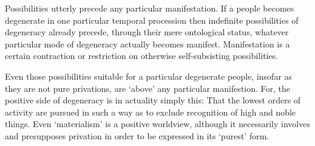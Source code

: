 \begin{footnotesize}
\begin{sffamily}
Possibilities utterly precede any particular manifestation. If a people becomes degenerate in one particular temporal procession then indefinite possibilities of degeneracy already precede, through their mere ontological status, whatever particular mode of degeneracy actually becomes manifest. Manifestation is a certain contraction or restriction on otherwise self-subsisting possibilities.

Even those possibilities suitable for a particular degenerate people, insofar as they are not pure privations, are `above' any particular manifestion. For, the positive side of degeneracy is in actuality simply this: That the lowest orders of activity are pursued in such a way as to exclude recognition of high and noble things. Even `materialism' is a positive worldview, although it necessarily involves and presupposes privation in order to be expressed in its `purest' form.

\hfill

\end{sffamily}
\end{footnotesize}

